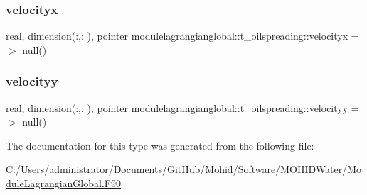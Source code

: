 \subsubsection{\texorpdfstring{velocityx}{velocityx}}
{\footnotesize\ttfamily real, dimension(\+:,\+:  ), pointer modulelagrangianglobal\+::t\+\_\+oilspreading\+::velocityx =$>$ null()\hspace{0.3cm}{\ttfamily [private]}}

\mbox{\label{structmodulelagrangianglobal_1_1t__oilspreading_a0e46af821f66ab85a5884f0670728a6d}} 
\subsubsection{\texorpdfstring{velocityy}{velocityy}}
{\footnotesize\ttfamily real, dimension(\+:,\+:  ), pointer modulelagrangianglobal\+::t\+\_\+oilspreading\+::velocityy =$>$ null()\hspace{0.3cm}{\ttfamily [private]}}



The documentation for this type was generated from the following file\+:\begin{DoxyCompactItemize}
\item 
C\+:/\+Users/administrator/\+Documents/\+Git\+Hub/\+Mohid/\+Software/\+M\+O\+H\+I\+D\+Water/\mbox{\hyperlink{_module_lagrangian_global_8_f90}{Module\+Lagrangian\+Global.\+F90}}\end{DoxyCompactItemize}
